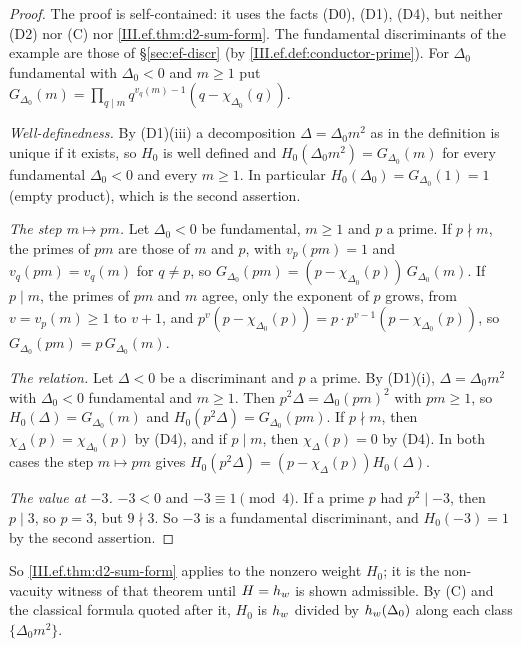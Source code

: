 \begin{example}
\end{example}
\begin{proof}
The proof is self-contained: it uses the facts (D0), (D1), (D4), but neither (D2) nor (C) nor \cref{III.ef.thm:d2-sum-form}. The fundamental
discriminants of the example are those of \S\ref{sec:ef-discr} (by \cref{III.ef.def:conductor-prime}). For $\Delta_0$ fundamental with
$\Delta_0<0$ and $m\ge1$ put $G_{\Delta_0}(m)=\prod_{q\mid m}q^{v_q(m)-1}(q-\chi_{\Delta_0}(q))$.

\emph{Well-definedness.} By (D1)(iii) a decomposition $\Delta=\Delta_0m^2$ as in the definition is unique if it exists, so $H_0$ is well defined
and $H_0(\Delta_0m^2)=G_{\Delta_0}(m)$ for every fundamental $\Delta_0<0$ and every $m\ge1$. In particular $H_0(\Delta_0)=G_{\Delta_0}(1)=1$ (empty
product), which is the second assertion.

\emph{The step $m\mapsto pm$.} Let $\Delta_0<0$ be fundamental, $m\ge1$ and $p$ a prime. If $p\nmid m$, the primes of $pm$ are those of $m$ and
$p$, with $v_p(pm)=1$ and $v_q(pm)=v_q(m)$ for $q\ne p$, so $G_{\Delta_0}(pm)=(p-\chi_{\Delta_0}(p))\,G_{\Delta_0}(m)$. If $p\mid m$, the primes of
$pm$ and $m$ agree, only the exponent of $p$ grows, from $v=v_p(m)\ge1$ to $v+1$, and $p^{v}(p-\chi_{\Delta_0}(p))=p\cdot p^{v-1}(p-\chi_{\Delta_0}(p))$,
so $G_{\Delta_0}(pm)=p\,G_{\Delta_0}(m)$.

\emph{The relation.} Let $\Delta<0$ be a discriminant and $p$ a prime. By (D1)(i), $\Delta=\Delta_0m^2$ with $\Delta_0<0$ fundamental and $m\ge1$.
Then $p^2\Delta=\Delta_0(pm)^2$ with $pm\ge1$, so $H_0(\Delta)=G_{\Delta_0}(m)$ and $H_0(p^2\Delta)=G_{\Delta_0}(pm)$. If $p\nmid m$, then
$\chi_\Delta(p)=\chi_{\Delta_0}(p)$ by (D4), and if $p\mid m$, then $\chi_\Delta(p)=0$ by (D4). In both cases the step $m\mapsto pm$ gives
$H_0(p^2\Delta)=(p-\chi_\Delta(p))H_0(\Delta)$.

\emph{The value at $-3$.} $-3<0$ and $-3\equiv1\pmod4$. If a prime $p$ had $p^2\mid-3$, then $p\mid3$, so $p=3$, but $9\nmid3$. So $-3$ is a
fundamental discriminant, and $H_0(-3)=1$ by the second assertion.
\end{proof}
\noindent So \cref{III.ef.thm:d2-sum-form} applies to the nonzero weight $H_0$; it is the non-vacuity witness of that theorem until $H=h_w$ is shown
admissible. By (C) and the classical formula quoted after it, $H_0$ is $h_w$ divided by $h_w(\Delta_0)$ along each class $\{\Delta_0m^2\}$.

